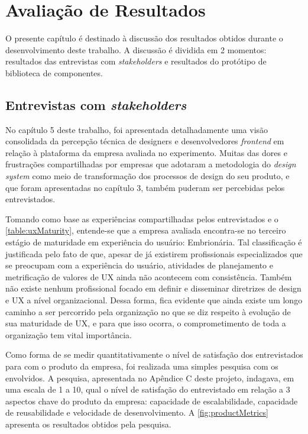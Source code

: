 
\chapter{Avaliação de Resultados}
\label{chap:resultados}

O presente capítulo é destinado à discussão dos resultados obtidos durante o desenvolvimento deste trabalho. A discussão é dividida em 2 momentos: resultados das entrevistas com \textit{stakeholders} e resultados do protótipo de biblioteca de componentes.

\section{Entrevistas com \textit{stakeholders}}
\label{sec:resEntrevistas}

No capítulo 5 deste trabalho, foi apresentada detalhadamente uma visão consolidada da percepção técnica de designers e desenvolvedores \textit{frontend} em relação à plataforma da empresa avaliada no experimento. Muitas das dores e frustrações compartilhadas por empresas que adotaram a metodologia do \textit{design system} como meio de transformação dos processos de design do seu produto, e que foram apresentadas no capítulo 3, também puderam ser percebidas pelos entrevistados.

Tomando como base as experiências compartilhadas pelos entrevistados e o \autoref{table:uxMaturity}, entende-se que a empresa avaliada encontra-se no terceiro estágio de maturidade em experiência do usuário: Embrionária. Tal classificação é justificada pelo fato de que, apesar de já existirem profissionais especializados que se preocupam com a experiência do usuário, atividades de planejamento e metrificação de valores de UX ainda não acontecem com consistência. Também não existe nenhum profissional focado em definir e disseminar diretrizes de design e UX a nível organizacional. Dessa forma, fica evidente que ainda existe um longo caminho a ser percorrido pela organização no que se diz respeito à evolução de sua maturidade de UX, e para que isso ocorra, o comprometimento de toda a organização tem vital importância.

Como forma de se medir quantitativamente o nível de satisfação dos entrevistados para com o produto da empresa, foi realizada uma simples pesquisa com os envolvidos. A pesquisa, apresentada no Apêndice C deste projeto, indagava, em uma escala de 1 a 10, qual o nível de satisfação do entrevistado em relação a 3 aspectos chave do produto da empresa: capacidade de escalabilidade, capacidade de reusabilidade e velocidade de desenvolvimento. A \autoref{fig:productMetrics} apresenta os resultados obtidos pela pesquisa.

